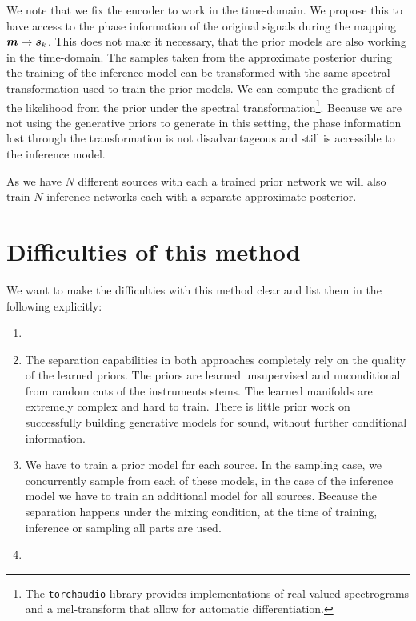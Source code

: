 We note that we fix the encoder to work in the time-domain. We propose this to have access to the phase information of the original signals during the mapping \(\m \to \s_k\). This does not make it necessary, that the prior models are also working in the time-domain. The samples taken from the approximate posterior during the training of the inference model can be transformed with the same spectral transformation used to train the prior models. We can compute the gradient of the likelihood from the prior under the spectral transformation\footnote{The \texttt{torchaudio} library provides implementations of real-valued spectrograms and a mel-transform that allow for automatic differentiation.}. Because we are not using the generative priors to generate in this setting, the phase information lost through the transformation is not disadvantageous and still is accessible to the inference model.

As we have \(N\) different sources with each a trained prior network we will also train \(N\) inference networks each with a separate approximate posterior.

\section{Difficulties of this method}
We want to make the difficulties with this method clear and list them in the following explicitly:

\begin{enumerate}
    \item {}
    \item The separation capabilities in both approaches completely rely on the quality of the learned priors. The priors are learned unsupervised and unconditional from random cuts of the instruments stems. The learned manifolds are extremely complex and hard to train. There is little prior work on successfully building generative models for sound, without further conditional information.
    \item We have to train a prior model for each source. In the sampling case, we concurrently sample from each of these models, in the case of the inference model we have to train an additional model for all sources. Because the separation happens under the mixing condition, at the time of training, inference or sampling all parts are used.
    \item {}
\end{enumerate}

